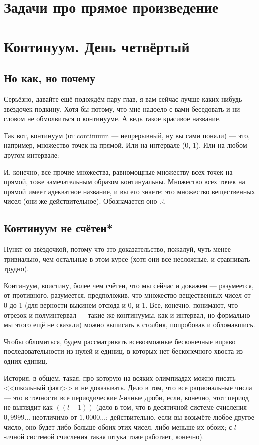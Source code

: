 \documentclass[12pt, onecolumn]{report}
\begin{document}
\chapter*{Задачи про прямое произведение}

\chapter{Континуум. День четвёртый}
\section{Но как, но почему}
Серьёзно, давайте ещё подождём пару глав, я вам сейчас лучше каких-нибудь  звёздочек подкину. Хотя бы потому, что мне надоело с вами беседовать и ни словом не обмолвиться о континууме. А ведь такое красивое название.

Так вот, континуум (от continuum --- непрерывный, ну вы сами поняли) --- это, например, множество точек на прямой. Или на интервале (0, 1). Или на любом другом интервале:

И, конечно, все прочие множества, равномощные множеству всех точек на прямой, тоже замечательным образом континуальны. Множество всех точек на прямой имеет адекватное название, и вы его знаете: это множество вещественных чисел (они же действительное). Обозначается оно $\mathbb R$.

\section{Континуум не счётен*}
Пункт со звёздочкой, потому что это доказательство, пожалуй, чуть менее тривиально, чем остальные в этом курсе (хотя они все несложные, и сравнивать трудно).

Континуум, воистину, более чем счётен, что мы сейчас и докажем --- разумеется, от противного, разумеется, предположив, что множество вещественных чисел от 0 до 1 (для верности выкинем отсюда и 0, и 1. Все, конечно, понимают, что отрезок и полуинтервал --- такие же континуумы, как и интервал, но формально мы этого ещё не сказали) можно выписать в столбик, попробовав и обломавшись.

Чтобы обломиться, будем рассматривать всевозможные бесконечные вправо последовательности из нулей и единиц, в которых нет бесконечного хвоста из одних единиц.

История, в общем, такая, про которую на всяких олимпиадах можно писать <<школьный факт>> и не доказывать. Дело в том, что все рациональные числа --- это в точности все периодические $l$-ичные дроби, если, конечно, этот период не выглядит как $((l-1))$ (дело в том, что в десятичной системе счисления $0,9999\ldots$ неотличимо от $1,0000\ldots$: действительно, если вы возьмёте любое другое число, оно будет либо больше обоих этих чисел, либо меньше их обоих; с $l$-ичной системой счисления такая штука тоже работает, конечно).
\end{document}
